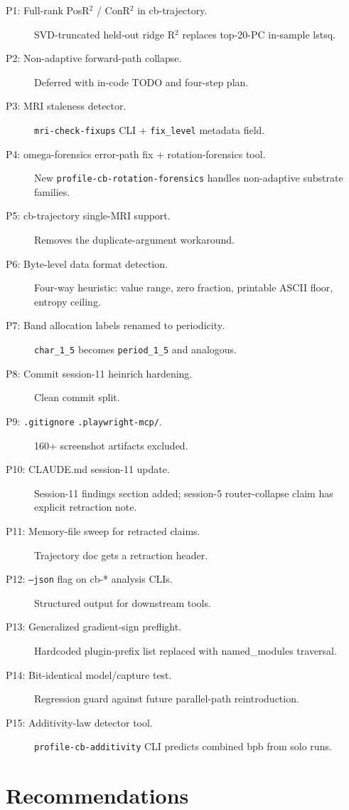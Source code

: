 \documentclass[11pt,openany]{book}
\begin{document}
\begin{description}
  \item[P1: Full-rank PosR$^2$ / ConR$^2$ in cb-trajectory.] SVD-truncated
  held-out ridge R$^2$ replaces top-20-PC in-sample lstsq.
  \item[P2: Non-adaptive forward-path collapse.] Deferred with in-code
  TODO and four-step plan.
  \item[P3: MRI staleness detector.] \texttt{mri-check-fixups} CLI +
  \texttt{fix\_level} metadata field.
  \item[P4: omega-forensics error-path fix + rotation-forensics tool.]
  New \texttt{profile-cb-rotation-forensics} handles non-adaptive
  substrate families.
  \item[P5: cb-trajectory single-MRI support.] Removes the duplicate-argument
  workaround.
  \item[P6: Byte-level data format detection.] Four-way heuristic:
  value range, zero fraction, printable ASCII floor, entropy ceiling.
  \item[P7: Band allocation labels renamed to periodicity.]
  \texttt{char\_1\_5} becomes \texttt{period\_1\_5} and analogous.
  \item[P8: Commit session-11 heinrich hardening.] Clean commit split.
  \item[P9: \texttt{.gitignore} \texttt{.playwright-mcp/}.] 160+
  screenshot artifacts excluded.
  \item[P10: CLAUDE.md session-11 update.] Session-11 findings section
  added; session-5 router-collapse claim has explicit retraction note.
  \item[P11: Memory-file sweep for retracted claims.] Trajectory doc
  gets a retraction header.
  \item[P12: \texttt{--json} flag on cb-* analysis CLIs.] Structured
  output for downstream tools.
  \item[P13: Generalized gradient-sign preflight.] Hardcoded
  plugin-prefix list replaced with named\_modules traversal.
  \item[P14: Bit-identical model/capture test.] Regression guard
  against future parallel-path reintroduction.
  \item[P15: Additivity-law detector tool.] \texttt{profile-cb-additivity}
  CLI predicts combined bpb from solo runs.
\end{description}

\chapter{Recommendations}
\end{document}
